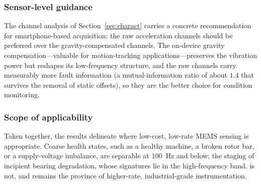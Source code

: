 \subsubsection{Sensor-level guidance}
The channel analysis of Section~\ref{sec:charact} carries a concrete
recommendation for smartphone-based acquisition: the raw acceleration channels
should be preferred over the gravity-compensated channels. The on-device gravity
compensation---valuable for motion-tracking applications---preserves the vibration
power but reshapes its low-frequency structure, and the raw channels carry
measurably more fault information (a mutual-information ratio of about $1.4$ that
survives the removal of static offsets), so they are the better choice for
condition monitoring.

\subsubsection{Scope of applicability}
Taken together, the results delineate where low-cost, low-rate MEMS sensing is
appropriate. Coarse health states, such as a healthy machine, a broken rotor bar,
or a supply-voltage imbalance, are separable at $100$~Hz and below; the staging of
incipient bearing degradation, whose signatures lie in the high-frequency band, is
not, and remains the province of higher-rate, industrial-grade instrumentation.

